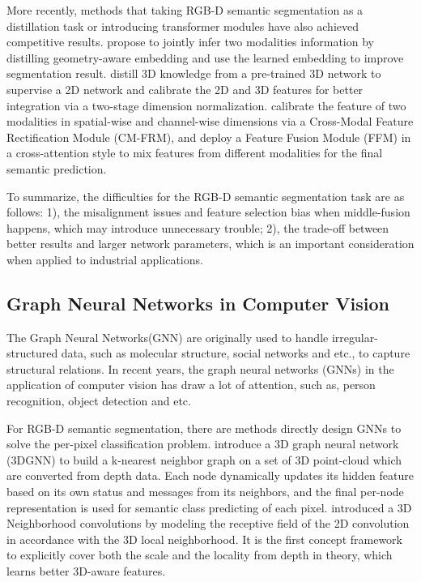﻿\documentclass[journal]{IEEEtran}
\begin{document}
    More recently, methods that taking RGB-D semantic segmentation as a distillation task or introducing transformer modules have also achieved competitive results. \cite{jiao2019geometrydistillation} propose to  jointly infer two modalities information by distilling geometry-aware embedding and use the learned embedding to improve segmentation result. \cite{liu2021distillation} distill 3D knowledge from a pre-trained 3D network to supervise a 2D network and calibrate the 2D and 3D features for better integration via a two-stage dimension normalization. \cite{liu2022cmx} calibrate the feature of two modalities in spatial-wise and channel-wise dimensions via a Cross-Modal Feature Rectification Module (CM-FRM), and deploy a Feature Fusion Module (FFM) in a cross-attention style to mix features from different modalities for the final semantic prediction. 
  
    To summarize, the difficulties for the RGB-D semantic segmentation task are as follows: 1), the misalignment issues and feature selection bias when middle-fusion happens, which may introduce unnecessary trouble; 2), the trade-off between better results and larger network parameters, which is an important consideration when applied to industrial applications.  \\   

\subsection{Graph Neural Networks in Computer Vision}  
 
    The Graph Neural Networks(GNN) are originally used to handle irregular-structured data, such as molecular structure, social networks and etc., to capture structural relations. In recent years, the graph neural networks (GNNs) in the application of computer vision has draw a lot of attention, such as, person recognition\cite{yao2022sparse}, object detection\cite{zhao2021graphfpn}\cite{shi2020point}\cite{zhang2021pc} and etc. 
 
   
    For RGB-D semantic segmentation, there are methods directly design GNNs to solve the per-pixel classification problem. \cite{qi20173d} introduce a 3D graph neural network (3DGNN) to build a k-nearest neighbor graph on a set of 3D point-cloud which are converted from depth data. Each node dynamically updates its hidden feature based on its own status and messages from its neighbors, and the final per-node representation is used for semantic class predicting of each pixel.  \cite{chen20193dneighbor}introduced a 3D Neighborhood convolutions by modeling the receptive field of the 2D convolution in accordance with the 3D local neighborhood. It is the first concept framework to explicitly cover both the scale and the locality from depth in theory, which learns better 3D-aware features.
    
\end{document}
